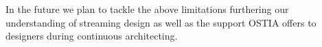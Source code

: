 
In the future we plan to tackle the above limitations furthering our understanding of streaming design as well as the support OSTIA offers to designers during continuous architecting.

